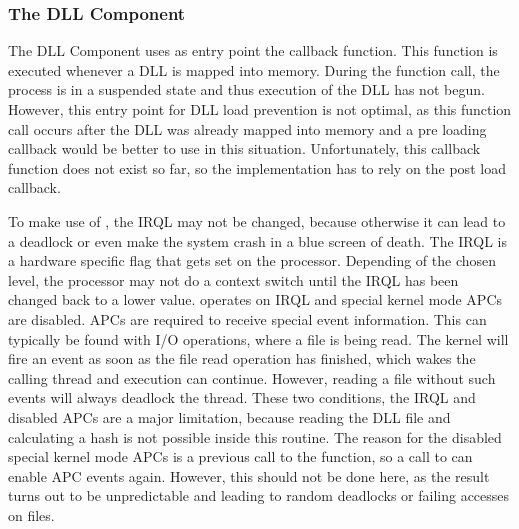 \subsubsection{The DLL Component}
The DLL Component uses as entry point the  callback function. This function is executed whenever a \gls{DLL} is mapped into memory. During the function call, the process is in a suspended state and thus execution of the \gls{DLL} has not begun. However, this entry point for \gls{DLL} load prevention is not optimal, as this function call occurs after the \gls{DLL} was already mapped into memory and a pre loading callback would be better to use in this situation. Unfortunately, this callback function does not exist so far, so the implementation has to rely on the post load callback.

\medskip

To make use of , the \gls{IRQL} may not be changed, because otherwise it can lead to a deadlock or even make the system crash in a blue screen of death. The \gls{IRQL} is a hardware specific flag that gets set on the processor. Depending of the chosen level, the processor may not do a context switch until the \gls{IRQL} has been changed back to a lower value.  operates on \gls{IRQL}  and special kernel mode \glspl{APC} are disabled. \glspl{APC} are required to receive special event information. This can typically be found with I/O operations, where a file is being read. The kernel will fire an event as soon as the file read operation has finished, which wakes the calling thread and execution can continue. However, reading a file without such events will always deadlock the thread. These two conditions, the \gls{IRQL} and disabled \glspl{APC} are a major limitation, because reading the DLL file and calculating a hash is not possible inside this routine. The reason for the disabled special kernel mode \glspl{APC} is a previous call to the  function, so a call to  can enable \gls{APC} events again. However, this should not be done here, as the result turns out to be unpredictable and leading to random deadlocks or failing accesses on files.

\medskip

